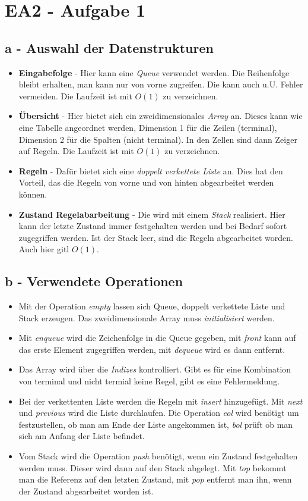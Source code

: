 \documentclass[12pt]{article}
\begin{document}
\section*{EA2 - Aufgabe 1}
\subsection*{a - Auswahl der Datenstrukturen}
\begin{itemize}
\item \textbf{Eingabefolge} - Hier kann eine \textit{Queue} verwendet werden. Die Reihenfolge bleibt erhalten, man kann nur von vorne zugreifen. 
Die kann auch u.U. Fehler vermeiden. Die Laufzeit ist mit $O(1)$ zu verzeichnen.
\item \textbf{Übersicht} - Hier bietet sich ein zweidimensionales \textit{Array} an. Dieses kann wie eine Tabelle angeordnet werden, 
Dimension 1 für die Zeilen (terminal), Dimension 2 für die Spalten (nicht terminal). In den Zellen sind dann Zeiger auf Regeln.  Die Laufzeit ist mit $O(1)$ zu verzeichnen.
\item \textbf{Regeln} - Dafür bietet sich eine \textit{doppelt verkettete Liste} an. Dies hat den Vorteil, das die Regeln von vorne und von hinten abgearbeitet werden können.
\item \textbf{Zustand Regelabarbeitung} - Die wird mit einem \textit{Stack} realisiert. Hier kann der letzte Zustand immer festgehalten werden und bei Bedarf sofort
 zugegriffen werden. Ist der Stack leer, sind die Regeln abgearbeitet worden. Auch hier gitl $O(1)$.
\end{itemize}

\subsection*{b - Verwendete Operationen}
\begin{itemize}
\item Mit der Operation \textit{empty} lassen sich Queue, doppelt verkettete Liste und Stack erzeugen. Das zweidimensionale Array muss \textit{initialisiert} werden. 
\item Mit \textit{enqueue} wird die Zeichenfolge in die Queue gegeben, mit \textit{front} kann auf das erste Element zugegriffen werden, mit \textit{dequeue} wird es dann entfernt.
\item Das Array wird über die \textit{Indizes} kontrolliert. Gibt es für eine Kombination von terminal und nicht termial keine Regel, gibt es eine Fehlermeldung.
\item Bei der verkettenten Liste werden die Regeln mit \textit{insert} hinzugefügt. Mit \textit{next} und \textit{previous} wird die Liste durchlaufen. Die Operation \textit{eol} wird benötigt
um festzustellen, ob man am Ende der Liste angekommen ist, \textit{bol} prüft ob man sich am Anfang der Liste befindet. 
\item Vom Stack wird die Operation \textit{push} benötigt, wenn ein Zustand festgehalten werden muss.  Dieser wird dann auf den Stack abgelegt. Mit \textit{top} bekommt man die Referenz auf den letzten
Zustand, mit \textit{pop} entfernt man ihn, wenn der Zustand abgearbeitet worden ist.  
\end{itemize}
\end{document}
